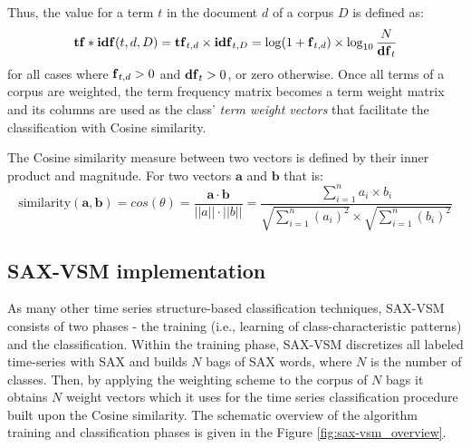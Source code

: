 Thus, the \tfidf value for a term $\textit{t}$ in the document 
$\textit{d}$ of a corpus $\textit{D}$ is defined as:
\begin{equation}
 \text{\textbf{tf}} \ast \text{\textbf{idf}}(t, d, D) =  \text{\textbf{tf}}_{t, d} \times \text{\textbf{idf}}_{t, D} = \log(1 + \text{\textbf{f}}_{t,d})
\times \log_{10}\frac{N}{\mbox{\textbf{df}}_{t}}
 \label{formula:tfidf}
\end{equation} 
for all cases where $\mbox{\textbf{f}}_{t,d}>0$ and $\mbox{\textbf{df}}_{t}>0$, or zero otherwise.
Once all terms of a corpus are weighted, the term frequency matrix becomes a term weight matrix and its columns 
are used as the class' \textit{term weight vectors} that facilitate the classification with Cosine similarity. 

The Cosine similarity measure between two vectors is defined by their inner product and magnitude. 
For two vectors $\mathbf{a}$ and $\mathbf{b}$ that is:
\begin{equation}
\mbox{similarity}(\mathbf{a},\mathbf{b}) = cos(\theta) = 
\frac{ \mathbf{a} \cdot \mathbf{b} } {\left| \left| a \right| \right| \cdot \left| \left| b \right|\right|} =
\frac{ \sum\limits_{i=1}^{n}{a_{i} \times b_{i}} }{ \sqrt{\sum\limits_{i=1}^{n}{(a_{i})^2}} \times \sqrt{\sum\limits_{i=1}^{n}{(b_{i})^2}}}
\label{eq:cosine_similarity}
\end{equation} 

\subsection{SAX-VSM implementation} \label{sax-vsm}
As many other time series structure-based classification techniques, SAX-VSM consists of two 
phases - the training (i.e., learning of class-characteristic patterns) and the classification. 
Within the training phase, SAX-VSM discretizes all labeled time-series with SAX and builds $N$ bags 
of SAX words, where $N$ is the number of classes. 
Then, by applying the \tfidf weighting scheme to the corpus of $N$ bags it obtains $N$ weight vectors 
which it uses for the time series classification procedure built upon the Cosine similarity. 
The schematic overview of the algorithm training and classification phases is given in the Figure \ref{fig:sax-vsm_overview}.

